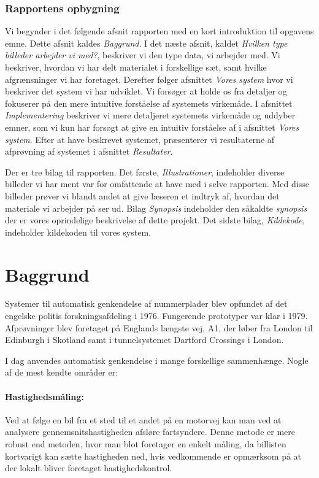 \subsubsection*{Rapportens opbygning}
Vi begynder i det følgende afsnit rapporten med en kort introduktion til opgavens emne. Dette afsnit kaldes \textit{Baggrund}. I det næste afsnit, kaldet \textit{Hvilken type billeder arbejder vi med?}, beskriver vi den type data, vi arbejder med. Vi beskriver, hvordan vi har delt materialet i forskellige sæt, samt hvilke afgrænsninger vi har foretaget. Derefter følger afsnittet \textit{Vores system} hvor vi beskriver det system vi har udviklet. Vi forsøger at holde os fra detaljer og fokuserer på den mere intuitive forståelse af systemets virkemåde. I afsnittet \textit{Implementering} beskriver vi mere detaljeret systemets virkemåde og uddyber emner, som vi kun har forsøgt at give en intuitiv forståelse af i afsnittet \textit{Vores system}. Efter at have beskrevet systemet, præsenterer vi resultaterne af afprøvning af systemet i afsnittet \textit{Resultater}.

Der er tre bilag til rapporten. Det første, \textit{Illustrationer}, indeholder diverse billeder vi har ment var for omfattende at have med i selve rapporten. Med disse billeder prøver vi blandt andet at give læseren et indtryk af, hvordan det materiale vi arbejder på ser ud. Bilag \textit{Synopsis} indeholder den såkaldte \textit{synopsis} der er vores oprindelige beskrivelse af dette projekt. Det sidste bilag, \textit{Kildekode}, indeholder kildekoden til vores system.

\section{Baggrund}
Systemer til automatisk genkendelse af nummerplader blev opfundet af det engelske politis forskningsafdeling i 1976. Fungerende prototyper var klar i 1979. Afprøvninger blev foretaget på Englands længste vej, A1, der løber fra London til Edinburgh i Skotland samt i tunnelsystemet Dartford Crossings i London\cite{wiki_baggrund}. 

I dag anvendes automatisk genkendelse i mange forskellige sammenhænge. Nogle af de mest kendte områder er:

\paragraph{Hastighedsmåling:}
Ved at følge en bil fra et sted til et andet på en motorvej kan man ved at analysere gennemsnitshastigheden afsløre fartsyndere. Denne metode er mere robust end metoden, hvor man blot foretager en enkelt måling, da billisten kortvarigt kan sætte hastigheden ned, hvis vedkommende er opmærksom på at der lokalt bliver foretaget hastighedskontrol.

